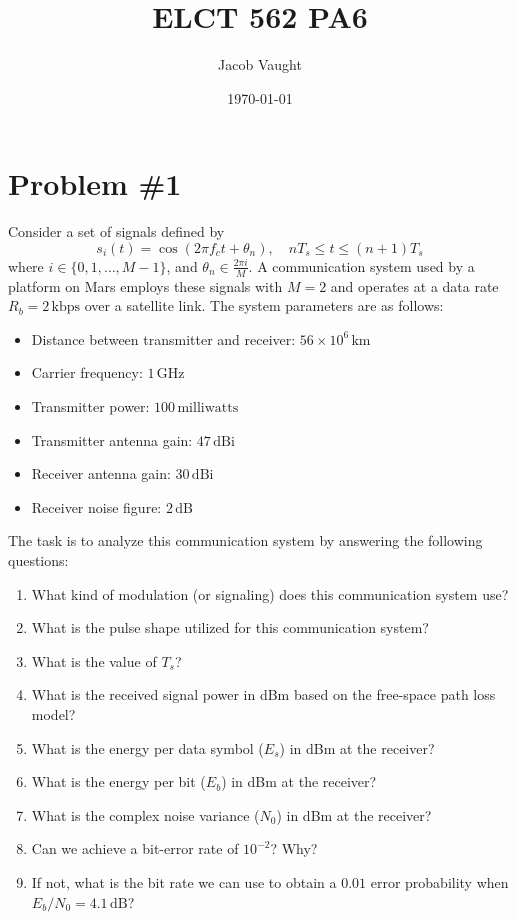 \documentclass[12pt]{article}
\title{ELCT 562 PA6}
\author{Jacob Vaught}
\date{\today}
\begin{document}
\maketitle

\section*{Problem \#1}
Consider a set of signals defined by
\[
s_i(t) = \cos(2\pi f_c t + \theta_n), \quad nT_s \leq t \leq (n + 1)T_s
\]
where $i \in \{0,1,\ldots, M-1\}$, and $\theta_n \in \frac{2\pi i}{M}$. A communication system used by a platform on Mars employs these signals with $M = 2$ and operates at a data rate $R_b = 2\, \text{kbps}$ over a satellite link. The system parameters are as follows:
\begin{itemize}
    \item Distance between transmitter and receiver: $56 \times 10^6\, \text{km}$
    \item Carrier frequency: $1\, \text{GHz}$
    \item Transmitter power: $100\, \text{milliwatts}$
    \item Transmitter antenna gain: $47\, \text{dBi}$
    \item Receiver antenna gain: $30\, \text{dBi}$
    \item Receiver noise figure: $2\, \text{dB}$
\end{itemize}
The task is to analyze this communication system by answering the following questions:
\begin{enumerate}
    \item What kind of modulation (or signaling) does this communication system use?
    \item What is the pulse shape utilized for this communication system?
    \item What is the value of $T_s$?
    \item What is the received signal power in dBm based on the free-space path loss model?
    \item What is the energy per data symbol ($E_s$) in dBm at the receiver?
    \item What is the energy per bit ($E_b$) in dBm at the receiver?
    \item What is the complex noise variance ($N_0$) in dBm at the receiver?
    \item Can we achieve a bit-error rate of $10^{-2}$? Why?
    \item If not, what is the bit rate we can use to obtain a $0.01$ error probability when $E_b/N_0 = 4.1\, \text{dB}$?
\end{enumerate}
\end{document}
